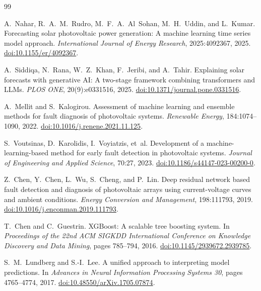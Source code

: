 \documentclass[11pt,a4paper,twoside]{article}
\begin{document}
\clearpage

\begingroup
\setlength{\parskip}{0pt}
\begin{thebibliography}{99}
\setlength{\itemsep}{0pt}

A.~Nahar, R.~A.~M.~Rudro, M.~F.~A.~Al~Sohan, M.~H.~Uddin, and L.~Kumar. Forecasting solar photovoltaic power generation: A machine learning time series model approach. \emph{International Journal of Energy Research}, 2025:4092367, 2025.
\href{https://doi.org/10.1155/er/4092367}{doi:10.1155/er/4092367}.

A.~Siddiqa, N.~Rana, W.~Z.~Khan, F.~Jeribi, and A.~Tahir. Explaining solar forecasts with generative AI: A two-stage framework combining transformers and LLMs. \emph{PLOS ONE}, 20(9):e0331516, 2025.
\href{https://doi.org/10.1371/journal.pone.0331516}{doi:10.1371/journal.pone.0331516}.

A.~Mellit and S.~Kalogirou. Assessment of machine learning and ensemble methods for fault diagnosis of photovoltaic systems. \emph{Renewable Energy}, 184:1074--1090, 2022.
\href{https://doi.org/10.1016/j.renene.2021.11.125}{doi:10.1016/j.renene.2021.11.125}.

S.~Voutsinas, D.~Karolidis, I.~Voyiatzis, et~al. Development of a machine-learning-based method for early fault detection in photovoltaic systems. \emph{Journal of Engineering and Applied Science}, 70:27, 2023.
\href{https://doi.org/10.1186/s44147-023-00200-0}{doi:10.1186/s44147-023-00200-0}.

Z.~Chen, Y.~Chen, L.~Wu, S.~Cheng, and P.~Lin. Deep residual network based fault detection and diagnosis of photovoltaic arrays using current-voltage curves and ambient conditions. \emph{Energy Conversion and Management}, 198:111793, 2019.
\href{https://doi.org/10.1016/j.enconman.2019.111793}{doi:10.1016/j.enconman.2019.111793}.

T.~Chen and C.~Guestrin. XGBoost: A scalable tree boosting system. In \emph{Proceedings of the 22nd ACM SIGKDD International Conference on Knowledge Discovery and Data Mining}, pages 785--794, 2016.
\href{https://doi.org/10.1145/2939672.2939785}{doi:10.1145/2939672.2939785}.

S.~M.~Lundberg and S.-I.~Lee. A unified approach to interpreting model predictions. In \emph{Advances in Neural Information Processing Systems 30}, pages 4765--4774, 2017.
\href{https://doi.org/10.48550/arXiv.1705.07874}{doi:10.48550/arXiv.1705.07874}.


\end{thebibliography}
\end{document}
